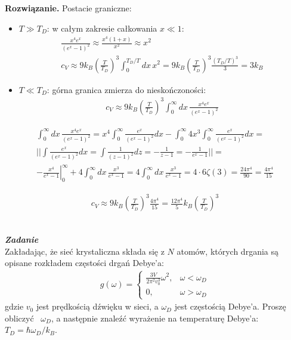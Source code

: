 \documentclass[11pt,a4paper]{article}
\newcounter{zadanie}\newcommand{\zadanie}[1][]{\addtocounter{zadanie}{1} ~\\ {\bf \emph{Zadanie \arabic{zadanie} #1 }} \\}
\newenvironment{solution}{\vspace{1cm} \par\textbf{Rozwiązanie.} \vspace{1cm}}{}
\begin{document}
\begin{solution}
Postacie graniczne:
\begin{itemize}
  \item $T \gg T_D$:
      w całym zakresie całkowania $x \ll 1$:
  \begin{align*}
    \frac{x^{4}e^{x}}{(e^{x} - 1)^2} \approx \frac{x^{4}(1 + x)}{x^2} \approx x^2 \\
    c_V \approx 9 k_B \left( \frac{T}{T_D} \right)^3 \int_0^{T_D/T} dx \, x^2 = 
    9 k_B \left( \frac{T}{T_D} \right)^3 \frac{(T_D/T)^3}{3} = 
    3 k_B
  \end{align*}  
  \item $T \ll T_D$:
    górna granica zmierza do nieskończoności:
  \begin{align*}
    c_V \approx 9 k_B \left( \frac{T}{T_D} \right)^3 \int_0^{\infty} dx \, \frac{x^{4}e^{x}}{(e^{x} - 1)^2}
  \end{align*}
\end{itemize}

\begin{align*}
  \int_0^{\infty} dx \, \frac{x^{4}e^{x}}{(e^{x} - 1)^2} = 
  x^{4} \int _0^{\infty} \frac{e^{x}}{(e^{x} - 1)^2} dx  - 
    \int_0^{\infty} 4 x^3 \int _0^{\infty} \frac{e^{x}}{(e^{x} - 1)^2} dx = \\ 
    || \int \frac{e^{x}}{(e^{x} - 1)^2} dx = 
       \int \frac{1}{(z - 1)^2}dz = -\frac{1}{z - 1} = -\frac{1}{e^{x} - 1} || = \\
     -\left.\frac{x^4}{e^{x} - 1}\right|_0^{\infty} +
    4 \int_0^{\infty} dx \, \frac{x^3}{e^{x} - 1} = 
    4 \int_0^{\infty} dx \, \frac{x^3}{e^{x} - 1} =
    4 \cdot 6\zeta(3) = \frac{24\pi^4}{90} = \frac{4\pi^4}{15}
\end{align*}

\begin{align*}
  c_V \approx 9 k_B \left( \frac{T}{T_D} \right)^3 \frac{4\pi^4}{15} = 
  \frac{12\pi^4}{5} k_B \left( \frac{T}{T_D} \right)^3
\end{align*}

\newpage   
\end{solution}
\zadanie[]

Zakładając, że sieć krystaliczna składa się z $N$ atomów, których drgania są opisane 
rozkładem częstości drgań Debye'a:
\begin{align*}
    g(\omega) = \begin{cases}
    \frac{3V}{2\pi^2 v_0^3} \omega^2, & \omega < \omega_D \\
    0, & \omega > \omega_D
    \end{cases}
\end{align*}
gdzie $v_0$ jest prędkością dźwięku w sieci, a $\omega_D$ jest częstością Debye'a.
Proszę obliczyć  $\omega_D$, a następnie znaleźć wyrażenie na temperaturę 
Debye'a: $T_D = \hbar \omega_D /k_B$.
\end{document}
